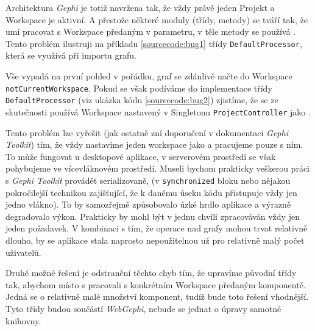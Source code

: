 \documentclass[thesis=M,czech]{FITthesis}[2014/05/6]
\begin{document}
 \textit{\cite{gephi:toolkit}}
 
 Architektura \textit{Gephi} je totiž navržena tak, že vždy právě jeden Projekt a Workspace je aktivní. A přestože některé moduly (třídy, metody) se tváří tak,
 že umí pracovat s Workspace předaným v parametru, v těle metody se používá . Tento problém ilustruji na příkladu \ref{sourcecode:bug1} třídy \texttt{DefaultProcessor}, která se
 využívá při importu grafu.
 

 
 Vše vypadá na první pohled v pořádku, graf se zdánlivě načte do Workspace \texttt{notCurrentWorkspace}. Pokud se však podíváme do implementace třídy \texttt{DefaultProcessor} (viz ukázka kódu \ref{sourcecode:bug2}) zjistíme, že 
 se ze skutečnosti používá Workspace nastavený v Singletonu \texttt{ProjectController} jako .


  
 Tento problém lze vyřešit (jak ostatně zní doporučení v dokumentaci \textit{Gephi Toolkit}) tím, že vždy nastavíme jeden workspace jako  a pracujeme pouze s ním.
 To může fungovat u desktopové aplikace, v serverovém prostředí se však pohybujeme ve vícevláknovém prostředí. Museli bychom prakticky veškerou práci s \textit{Gephi Toolkit}
 provádět serializovaně, (v \texttt{synchronized} bloku nebo nějakou pokročilejší technikou zajišťující, že k danému úseku kódu přistupuje vždy jen jedno vlákno). To
 by samozřejmě způsobovalo úzké hrdlo aplikace a výrazně degradovalo výkon. Prakticky by mohl být v jednu chvíli zpracováván vždy jen jeden požadavek.
 V kombinaci s tím, že operace nad grafy mohou trvat relativně dlouho, by se aplikace stala naprosto nepoužitelnou už pro relativně malý počet uživatelů.
 
 Druhé možné řešení je odstranění těchto chyb tím, že upravíme původní třídy tak, abychom místo s  pracovali s konkrétním Workspace předaným komponentě.
 Jedná se o relativně malé množství komponent, tudíž bude toto řešení vhodnější. Tyto třídy budou součástí \textit{WebGephi}, nebude se jednat o úpravy samotné knihovny.
 
\end{document}

